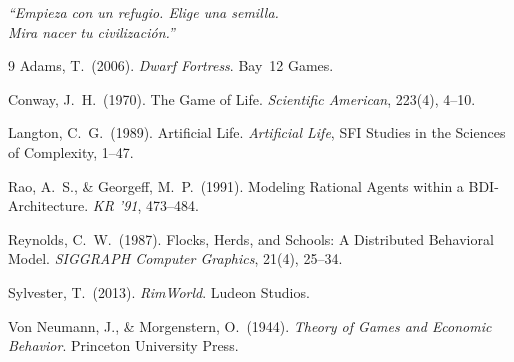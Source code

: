 \documentclass[11pt,a4paper,twocolumn]{article}
\begin{document}
\smallskip
\begin{center}
  \textit{``Empieza con un refugio. Elige una semilla.\\
  Mira nacer tu civilizaci\'on.''}
\end{center}

\begin{thebibliography}{9}
    Adams, T.\ (2006). \textit{Dwarf Fortress}. Bay~12 Games.

    Conway, J.\ H.\ (1970). The Game of Life.
    \textit{Scientific American}, 223(4), 4--10.

    Langton, C.\ G.\ (1989). Artificial Life.
    \textit{Artificial Life}, SFI Studies in the Sciences of Complexity,
    1--47.

    Rao, A.\ S., \& Georgeff, M.\ P.\ (1991).
    Modeling Rational Agents within a BDI-Architecture.
    \textit{KR '91}, 473--484.

    Reynolds, C.\ W.\ (1987). Flocks, Herds, and Schools:
    A Distributed Behavioral Model.
    \textit{SIGGRAPH Computer Graphics}, 21(4), 25--34.

    Sylvester, T.\ (2013). \textit{RimWorld}. Ludeon Studios.

    Von Neumann, J., \& Morgenstern, O.\ (1944).
    \textit{Theory of Games and Economic Behavior}.
    Princeton University Press.
\end{thebibliography}
\end{document}
